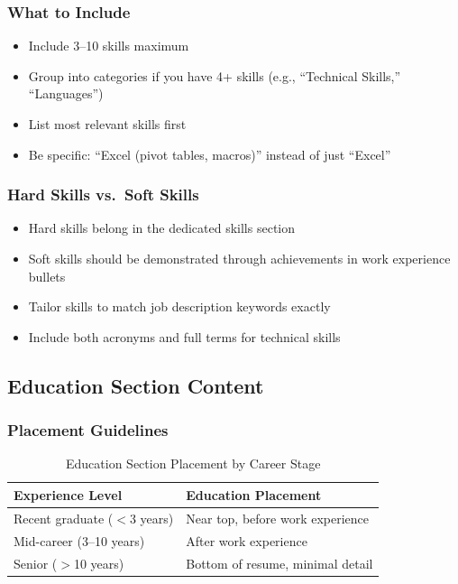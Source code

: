 \documentclass[11pt,a4paper]{article}
\begin{document}
\subsubsection{What to Include}

\begin{itemize}
    \item Include 3--10 skills maximum
    \item Group into categories if you have 4+ skills (e.g., ``Technical Skills,'' ``Languages'')
    \item List most relevant skills first
    \item Be specific: ``Excel (pivot tables, macros)'' instead of just ``Excel''
\end{itemize}

\subsubsection{Hard Skills vs.\ Soft Skills}

\begin{bestpractice}
\begin{itemize}[noitemsep]
    \item Hard skills belong in the dedicated skills section
    \item Soft skills should be demonstrated through achievements in work experience bullets
    \item Tailor skills to match job description keywords exactly
    \item Include both acronyms and full terms for technical skills
\end{itemize}
\end{bestpractice}

\subsection{Education Section Content}

\subsubsection{Placement Guidelines}

\begin{table}[h]
\centering
\begin{tabular}{@{}ll@{}}
\toprule
\textbf{Experience Level} & \textbf{Education Placement} \\
\midrule
Recent graduate ($<$3 years) & Near top, before work experience \\
Mid-career (3--10 years) & After work experience \\
Senior ($>$10 years) & Bottom of resume, minimal detail \\
\bottomrule
\end{tabular}
\caption{Education Section Placement by Career Stage}
\end{table}
\end{document}
